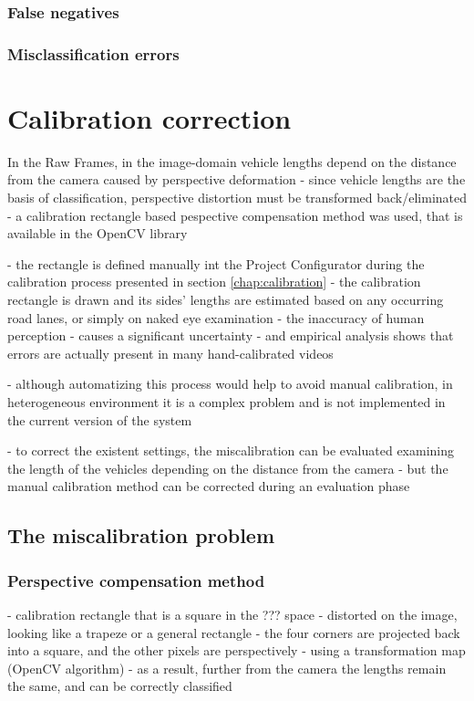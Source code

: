 \subsubsection{False negatives}
\subsubsection{Misclassification errors}

\section{Calibration correction}\label{chap:cal_corr}
In the Raw Frames, 
in the image-domain vehicle lengths depend on the distance from the camera caused by perspective deformation
- since vehicle lengths are the basis of classification, perspective distortion must be transformed back/eliminated
- a calibration rectangle based pespective compensation method was used, that is available in the OpenCV library \cite{PersComp}

- the rectangle is defined manually int the Project Configurator during the calibration process presented in section \ref{chap:calibration}
- the calibration rectangle is drawn and its sides' lengths are estimated based on any occurring road lanes, or simply on naked eye examination
- the inaccuracy of human perception
- causes a significant uncertainty
- and empirical analysis shows that errors are actually present in many hand-calibrated videos

- although automatizing this process would help to avoid manual calibration, in heterogeneous environment it is a complex problem and is not implemented in the current version of the system

- to correct the existent settings, the miscalibration can be evaluated examining the length of the vehicles depending on the distance from the camera
- but the manual calibration method can be corrected during an evaluation phase

\subsection{The miscalibration problem}
\subsubsection{Perspective compensation method}
- calibration rectangle that is a square in the ??? space
- distorted on the image, looking like a trapeze or a general rectangle
- the four corners are projected back into a square, and the other pixels are perspectively
- using a transformation map  (OpenCV algorithm)
- as a result, further from the camera the lengths remain the same, and can be correctly classified


